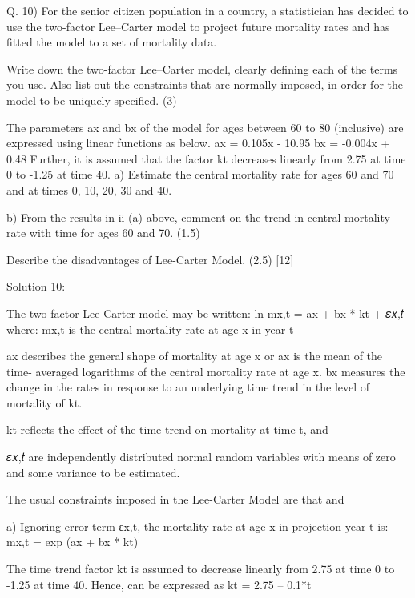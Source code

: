 \documentclass[a4paper,12pt]{article}
\begin{document}


Q. 10)
For the senior citizen population in a country, a statistician has decided to use the two-factor Lee–Carter model to project future mortality rates and has fitted the model to a set of mortality data.
\item  Write down the two-factor Lee–Carter model, clearly defining each of the terms you use. Also list out the constraints that are normally imposed, in order for the model to be uniquely specified.
(3)
\item   The parameters ax and bx of the model for ages between 60 to 80 (inclusive) are expressed using linear functions as below.
ax = 0.105x - 10.95
bx = -0.004x + 0.48
Further, it is assumed that the factor kt decreases linearly from 2.75 at time 0 to -1.25 at time 40.
a) Estimate the central mortality rate for ages 60 and 70 and at times 0, 10, 20, 30 and 40.

b) From the results in ii (a) above, comment on the trend in central mortality rate with time for ages 60 and 70.
(1.5)
\item   Describe the disadvantages of Lee-Carter Model.
(2.5)
[12]


Solution 10:
\item 
The two-factor Lee-Carter model may be written:
ln mx,t = ax + bx * kt + 𝜀𝑥,𝑡
where:
mx,t is the central mortality rate at age x in year t

ax describes the general shape of mortality at age x or ax is the mean of the time- averaged logarithms of the central mortality rate at age x. 
bx measures the change in the rates in response to an underlying time trend in the level of mortality of kt.

kt reflects the effect of the time trend on mortality at time t, and

𝜀𝑥,𝑡 are independently distributed normal random variables with means of zero and some variance to be estimated.

The usual constraints imposed in the Lee-Carter Model are that 
and


\item  
a) Ignoring error term εx,t, the mortality rate at age x in projection year t is:
mx,t = exp (ax + bx * kt)

The time trend factor kt is assumed to decrease linearly from 2.75 at time 0 to -1.25 at time 40. Hence, can be expressed as
kt = 2.75 – 0.1*t
\end{document}
